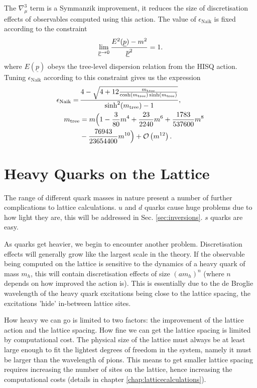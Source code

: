     The $\nabla^3_{\mu}$ term is a Symmanzik improvement, it reduces the size of discretisation effects of observables computed using this action. The value of $\epsilon_{\text{Naik}}$ is fixed according to the constraint
    \begin{align}
      \lim_{\underline{p}\to 0} {E^2(\underline{p})-m^2\over \underline{p}^2} = 1.
    \end{align}
    where $E(\underline{p})$ obeys the tree-level dispersion relation from the HISQ action. Tuning $\epsilon_{\text{Naik}}$ according to this constraint gives us the expression
    \begin{align}
      \epsilon_{\text{Naik}} = \,&{ 4 - \sqrt{ 4 + 12 {m_{\text{tree}}\over \cosh(m_{\text{tree}}) \sinh(m_{\text{tree}})} } \over \sinh^2(m_{\text{tree}}) - 1 }, \\
      \nonumber
      m_{\text{tree}} &= m\Big( 1 - {3\over 80}m^4 + {23\over 2240}m^6 + {1783\over 537600 }m^8 \\ &- {76943\over 23654400} m^{10} \Big) + \mathcal{O}\left( m^{12} \right). \nonumber
    \end{align}

    \section{Heavy Quarks on the Lattice}

    The range of different quark masses in nature present a number of further complications to lattice calculations. $u$ and $d$ quarks cause huge problems due to how light they are, this will be addressed in Sec. \ref{sec:inversions}. $s$ quarks are easy.

    As quarks get heavier, we begin to encounter another problem. Discretisation effects will generally grow like the largest scale in the theory. If the observable being computed on the lattice is sensitive to the dynamics of a heavy quark of mass $m_h$, this will contain discretisation effects of size $(am_h)^n$ (where $n$ depends on how improved the action is). This is essentially due to the de Broglie wavelength of the heavy quark excitations being close to the lattice spacing, the excitations 'hide' in-between lattice sites.

    How heavy we can go is limited to two factors: the improvement of the lattice action and the lattice spacing. How fine we can get the lattice spacing is limited by computational cost. The physical size of the lattice must always be at least large enough to fit the lightest degrees of freedom in the system, namely it must be larger than the wavelength of pions. This means to get smaller lattice spacing requires increasing the number of sites on the lattice, hence increasing the computational costs (details in chapter \ref{chap:latticecalculations}).

